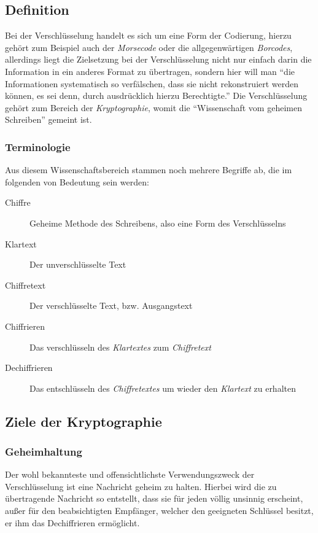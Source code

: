 \documentclass{scrarticle} %
\begin{document}
    \subsection{Definition}
    Bei der Verschlüsselung handelt es sich um eine Form der Codierung, hierzu gehört zum Beispiel auch der \emph{Morsecode} oder die allgegenwärtigen \emph{Borcodes}, allerdings liegt die Zielsetzung bei der Verschlüsselung nicht nur einfach darin die Information in ein anderes Format zu übertragen, sondern hier will man \enquote{die Informationen systematisch so verfälschen, dass sie nicht rekonstruiert werden können, es sei denn, durch ausdrücklich hierzu Berechtigte.} \autocite[263]{dankmeier2006}
    Die Verschlüsselung gehört zum Bereich der \emph{Kryptographie}, womit die \enquote{Wissenschaft vom geheimen Schreiben} \autocite[1]{watjen2008} gemeint ist.

    \subsubsection{Terminologie}
    Aus diesem Wissenschaftsbereich stammen noch mehrere Begriffe ab, die im folgenden von Bedeutung sein werden:
    \begin{description}
        \item[Chiffre] Geheime Methode des Schreibens, also eine Form des Verschlüsselns
        \item[Klartext] Der unverschlüsselte Text
        \item[Chiffretext] Der verschlüsselte Text, bzw. Ausgangstext
        \item[Chiffrieren] Das verschlüsseln des \emph{Klartextes} zum \emph{Chiffretext}
        \item[Dechiffrieren] Das entschlüsseln des \emph{Chiffretextes} um wieder den \emph{Klartext} zu erhalten
    \end{description}

    \subsection[Ziele]{Ziele der Kryptographie}
    \subsubsection{Geheimhaltung}
    Der wohl bekannteste und offensichtlichste Verwendungszweck der Verschlüsselung ist eine Nachricht geheim zu halten. Hierbei wird die zu übertragende Nachricht so entstellt, dass sie für jeden völlig unsinnig erscheint, außer für den beabsichtigten Empfänger, welcher den geeigneten Schlüssel besitzt, er ihm das Dechiffrieren ermöglicht.\autocite{beutelspacher2015}
\end{document}
